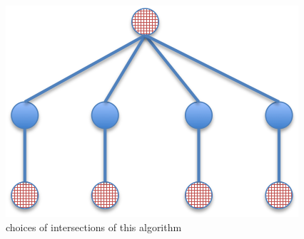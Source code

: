 \documentclass{article} %
\begin{document}
\begin{enumerate}
    \begin{figure}[H]
    \centering
	\includegraphics[width=\columnwidth, angle=0, scale=0.4]{pics/hw3_3_wrong.png}
	\caption{choices of intersections of this algorithm}
	\end{figure}

    
\end{enumerate}
\end{document}
